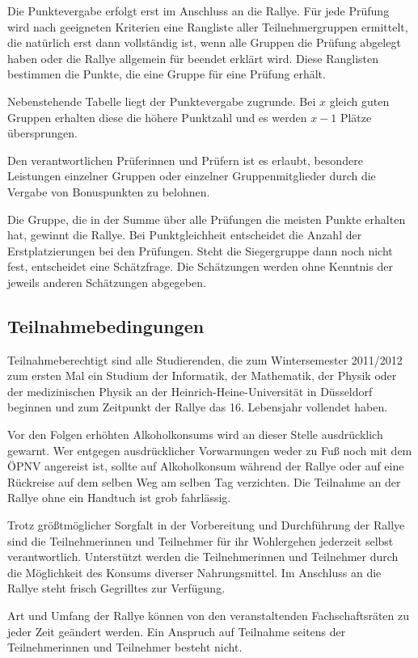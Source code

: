 \documentclass[a4paper,10pt]{article}
\begin{document}
Die Punktevergabe erfolgt erst im Anschluss an die Rallye. Für jede
Prüfung wird nach geeigneten Kriterien eine Rangliste aller
Teilnehmergruppen ermittelt, die natürlich erst dann vollständig ist,
wenn alle Gruppen die Prüfung abgelegt haben oder die Rallye allgemein
für beendet erklärt wird. Diese Ranglisten bestimmen die Punkte, die
eine Gruppe für eine Prüfung erhält.

Nebenstehende Tabelle liegt der Punktevergabe zugrunde. Bei $x$ gleich
guten Gruppen erhalten diese die höhere Punktzahl und es werden $x-1$ Plätze
übersprungen.

Den verantwortlichen Prüferinnen und Prüfern ist es erlaubt, besondere
Leistungen einzelner Gruppen oder einzelner Gruppenmitglieder durch die
Vergabe von Bonuspunkten zu belohnen.

Die Gruppe, die in der Summe über alle Prüfungen die meisten Punkte
erhalten hat, gewinnt die Rallye. Bei Punktgleichheit entscheidet die
Anzahl der Erstplatzierungen bei den Prüfungen. Steht die Siegergruppe
dann noch nicht fest, entscheidet eine Schätzfrage. Die Schätzungen
werden ohne Kenntnis der jeweils anderen Schätzungen abgegeben.

\subsection{Teilnahmebedingungen}

Teilnahmeberechtigt sind alle Studierenden, die zum Wintersemester 
2011/2012 zum ersten Mal ein Studium der
Informatik, der Mathematik, der Physik oder der medizinischen Physik an
der Heinrich-Heine-Universität in Düsseldorf beginnen und zum Zeitpunkt
der Rallye das 16. Lebensjahr vollendet haben.

Vor den Folgen erhöhten Alkoholkonsums wird an dieser Stelle
ausdrücklich gewarnt. Wer entgegen ausdrücklicher Vorwarnungen weder zu
Fuß noch mit dem ÖPNV angereist ist, sollte auf Alkoholkonsum während
der Rallye oder auf eine Rückreise auf dem selben Weg am selben Tag
verzichten. Die Teilnahme an der Rallye ohne ein Handtuch ist grob
fahrlässig.

Trotz größtmöglicher Sorgfalt in der Vorbereitung und Durchführung der
Rallye sind die Teilnehmerinnen und Teilnehmer für ihr Wohlergehen 
jederzeit selbst verantwortlich. Unterstützt werden die Teilnehmerinnen
und Teilnehmer durch die Möglichkeit des Konsums diverser Nahrungsmittel. 
Im Anschluss an die Rallye steht frisch Gegrilltes zur Verfügung.

Art und Umfang der Rallye können von den veranstaltenden Fachschaftsräten
zu jeder Zeit geändert werden. Ein Anspruch auf Teilnahme seitens der 
Teilnehmerinnen und Teilnehmer besteht nicht.
\end{document}
